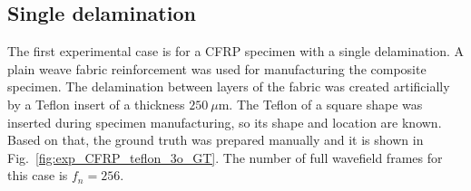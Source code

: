\begin{sloppypar}
	\subsection{Single delamination}
	The first experimental case is for a CFRP specimen with a single delamination. 
	A plain weave fabric reinforcement was used for manufacturing the composite specimen.
	The delamination between layers of the fabric was created artificially by a Teflon insert of a thickness \(250\ \mu\)m. 
	The Teflon of a square shape was inserted during specimen manufacturing, so its shape and location are known.
	Based on that, the ground truth was prepared manually and it is shown in Fig.~\ref{fig:exp_CFRP_teflon_3o_GT}. 
	The number of full wavefield frames for this case is \(f_n=256\).
%
	

\end{sloppypar}
